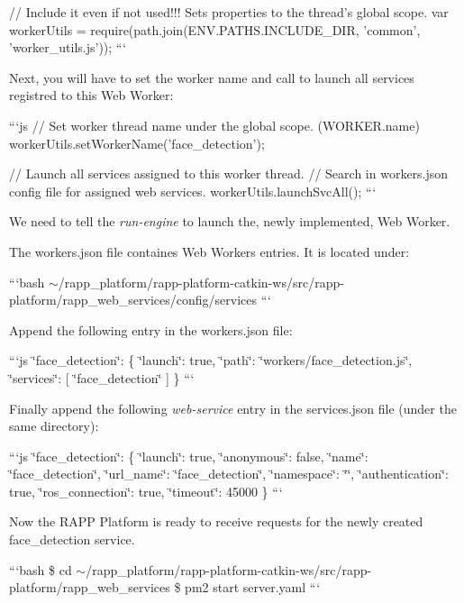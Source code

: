 // Include it even if not used!!! Sets properties to the thread's global scope. var worker\-Utils = require(path.\-join(E\-N\-V.\-P\-A\-T\-H\-S.\-I\-N\-C\-L\-U\-D\-E\-\_\-\-D\-I\-R, 'common', 'worker\-\_\-utils.\-js')); ```

Next, you will have to set the worker name and call to launch all services registred to this Web Worker\-:

```js // Set worker thread name under the global scope. (W\-O\-R\-K\-E\-R.\-name) worker\-Utils.\-set\-Worker\-Name('face\-\_\-detection');

// Launch all services assigned to this worker thread. // Search in workers.\-json config file for assigned web services. worker\-Utils.\-launch\-Svc\-All(); ```

We need to tell the {\itshape run-\/engine} to launch the, newly implemented, Web Worker.

The {\ttfamily workers.\-json} file containes Web Workers entries. It is located under\-:

```bash $\sim$/rapp\-\_\-platform/rapp-\/platform-\/catkin-\/ws/src/rapp-\/platform/rapp\-\_\-web\-\_\-services/config/services ```

Append the following entry in the workers.\-json file\-:

```js \char`\"{}face\-\_\-detection\char`\"{}\-: \{ \char`\"{}launch\char`\"{}\-: true, \char`\"{}path\char`\"{}\-: \char`\"{}workers/face\-\_\-detection.\-js\char`\"{}, \char`\"{}services\char`\"{}\-: \mbox{[} \char`\"{}face\-\_\-detection\char`\"{} \mbox{]} \} ```

Finally append the following {\itshape web-\/service} entry in the services.\-json file (under the same directory)\-:

```js \char`\"{}face\-\_\-detection\char`\"{}\-: \{ \char`\"{}launch\char`\"{}\-: true, \char`\"{}anonymous\char`\"{}\-: false, \char`\"{}name\char`\"{}\-: \char`\"{}face\-\_\-detection\char`\"{}, \char`\"{}url\-\_\-name\char`\"{}\-: \char`\"{}face\-\_\-detection\char`\"{}, \char`\"{}namespace\char`\"{}\-: \char`\"{}\char`\"{}, \char`\"{}authentication\char`\"{}\-: true, \char`\"{}ros\-\_\-connection\char`\"{}\-: true, \char`\"{}timeout\char`\"{}\-: 45000 \} ```

Now the R\-A\-P\-P Platform is ready to receive requests for the newly created face\-\_\-detection service.

```bash \$ cd $\sim$/rapp\-\_\-platform/rapp-\/platform-\/catkin-\/ws/src/rapp-\/platform/rapp\-\_\-web\-\_\-services \$ pm2 start server.\-yaml ```

